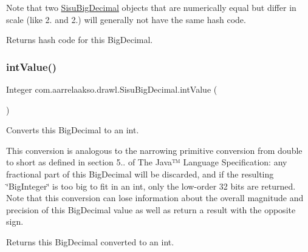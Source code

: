 Note that two \hyperlink{classcom_1_1aarrelaakso_1_1drawl_1_1_sisu_big_decimal}{Sisu\+Big\+Decimal} objects that are numerically equal but differ in scale (like 2. and 2.) will generally not have the same hash code.

\begin{DoxyReturn}{Returns}
hash code for this Big\+Decimal. 
\end{DoxyReturn}
\mbox{\label{classcom_1_1aarrelaakso_1_1drawl_1_1_sisu_big_decimal_a8d02465f77c81ac072066766db81d196}} 
\subsubsection{\texorpdfstring{int\+Value()}{intValue()}}
{\footnotesize\ttfamily Integer com.\+aarrelaakso.\+drawl.\+Sisu\+Big\+Decimal.\+int\+Value (\begin{DoxyParamCaption}{ }\end{DoxyParamCaption})\hspace{0.3cm}{\ttfamily [protected]}}



Converts this Big\+Decimal to an int. 

This conversion is analogous to the narrowing primitive conversion from double to short as defined in section 5.. of The Java™ Language Specification\+: any fractional part of this Big\+Decimal will be discarded, and if the resulting \char`\"{}\+Big\+Integer\char`\"{} is too big to fit in an int, only the low-\/order 32 bits are returned. Note that this conversion can lose information about the overall magnitude and precision of this Big\+Decimal value as well as return a result with the opposite sign.

\begin{DoxyReturn}{Returns}
this Big\+Decimal converted to an int. 
\end{DoxyReturn}
\mbox{\label{classcom_1_1aarrelaakso_1_1drawl_1_1_sisu_big_decimal_a0c8a57da15ab119fd46af9292ccfe028}} 
